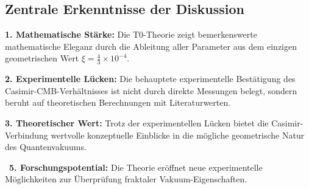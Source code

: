 \documentclass[12pt,a4paper]{article}
\begin{document}
	\begin{summary}
		\subsection{Zentrale Erkenntnisse der Diskussion}
		
		\textbf{1. Mathematische St\"arke:}
		Die T0-Theorie zeigt bemerkenswerte mathematische Eleganz durch die Ableitung aller Parameter aus dem einzigen geometrischen Wert $\xi = \frac{4}{3} \times 10^{-4}$.
		
		\textbf{2. Experimentelle L\"ucken:}
		Die behauptete experimentelle Best\"atigung des Casimir-CMB-Verh\"altnisses ist nicht durch direkte Messungen belegt, sondern beruht auf theoretischen Berechnungen mit Literaturwerten.
		
		\textbf{3. Theoretischer Wert:}
		Trotz der experimentellen L\"ucken bietet die Casimir-Verbindung wertvolle konzeptuelle Einblicke in die m\"ogliche geometrische Natur des Quantenvakuums.
		
		\
		\textbf{5. Forschungspotential:}
		Die Theorie er\"offnet neue experimentelle M\"oglichkeiten zur \"Uberpr\"ufung fraktaler Vakuum-Eigenschaften.
		
		
	\end{summary}
	
\end{document}

